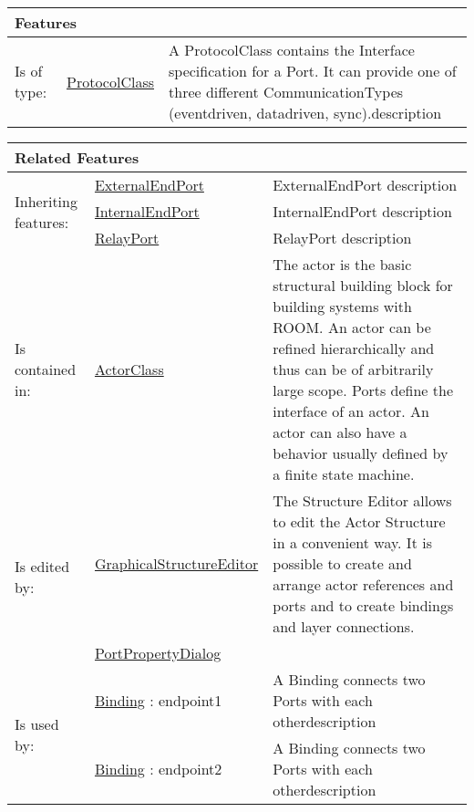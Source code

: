 			\vspace{\baselineskip}
			\begingroup
			\renewcommand{\arraystretch}{1.8} %
			\parbox{\textwidth}{
			\begin{longtable}{l l p{}}
				\multicolumn{2}{l}{\textbf{\large Features}} & \\
				\hline
			Is of type: & \tabitem \hyperlink{ref:ProtocolClass}{ProtocolClass}  & A ProtocolClass contains the Interface specification for a Port. It can provide one of three different CommunicationTypes (eventdriven, datadriven, sync).description \\
			\hline
			\end{longtable}	
			}
			\endgroup
			\vspace{\baselineskip}
			
			\vspace{\baselineskip}
			\begingroup
			\renewcommand{\arraystretch}{1.8} %
			\parbox{\textwidth}{
			\begin{longtable}{l l p{}}
				\multicolumn{2}{l}{\textbf{\large Related Features}} & \\
				\hline
			\multirow{3}{*}{Inheriting features:} & \tabitem \hyperlink{ref:ExternalEndPort}{ExternalEndPort}  & ExternalEndPort description\\
			& \tabitem \hyperlink{ref:InternalEndPort}{InternalEndPort}  & InternalEndPort description \\
			& \tabitem \hyperlink{ref:RelayPort}{RelayPort}  & RelayPort description \\
			\hline
			Is contained in: & \tabitem \hyperlink{ref:ActorClass}{ActorClass}  & The actor is the basic structural building block for building systems with ROOM. An actor can be refined hierarchically and thus can be of arbitrarily large scope. Ports define the interface of an actor. An actor can also have a behavior usually defined by a finite state machine. \\
			\hline
			\multirow{2}{*}{Is edited by:} & \tabitem \hyperlink{ref:GraphicalStructureEditor}{GraphicalStructureEditor}  & The Structure Editor allows to edit the Actor Structure in a convenient way. It is possible to create and arrange actor references and ports and to create bindings and layer connections.\\
			& \tabitem \hyperlink{ref:PortPropertyDialog}{PortPropertyDialog}  &  \\
			\hline
			\multirow{2}{*}{Is used by:} & \tabitem \hyperlink{ref:Binding}{Binding} : endpoint1 & A Binding connects two Ports with each otherdescription\\
			& \tabitem \hyperlink{ref:Binding}{Binding} : endpoint2 & A Binding connects two Ports with each otherdescription \\
			\hline
			\end{longtable}	
			}
			\endgroup
			\vspace{\baselineskip}
			
